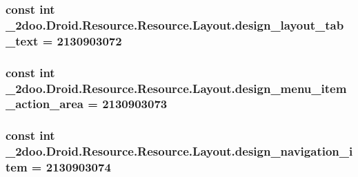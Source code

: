 \hypertarget{class__2doo_1_1_droid_1_1_resource_1_1_layout_3c7c09e85dca6d3d29ab4e9cdc7a7cc6}{
\subsubsection[{design\_\-layout\_\-tab\_\-text}]{\setlength{\rightskip}{0pt plus 5cm}const int \_\-2doo.Droid.Resource.Resource.Layout.design\_\-layout\_\-tab\_\-text = 2130903072}}
\label{class__2doo_1_1_droid_1_1_resource_1_1_layout_3c7c09e85dca6d3d29ab4e9cdc7a7cc6}


\hypertarget{class__2doo_1_1_droid_1_1_resource_1_1_layout_834928a32158ae76a247fbeb5786633e}{
\subsubsection[{design\_\-menu\_\-item\_\-action\_\-area}]{\setlength{\rightskip}{0pt plus 5cm}const int \_\-2doo.Droid.Resource.Resource.Layout.design\_\-menu\_\-item\_\-action\_\-area = 2130903073}}
\label{class__2doo_1_1_droid_1_1_resource_1_1_layout_834928a32158ae76a247fbeb5786633e}


\hypertarget{class__2doo_1_1_droid_1_1_resource_1_1_layout_32a613e7b870f9880707b43d41f13ec1}{
\subsubsection[{design\_\-navigation\_\-item}]{\setlength{\rightskip}{0pt plus 5cm}const int \_\-2doo.Droid.Resource.Resource.Layout.design\_\-navigation\_\-item = 2130903074}}
\label{class__2doo_1_1_droid_1_1_resource_1_1_layout_32a613e7b870f9880707b43d41f13ec1}



